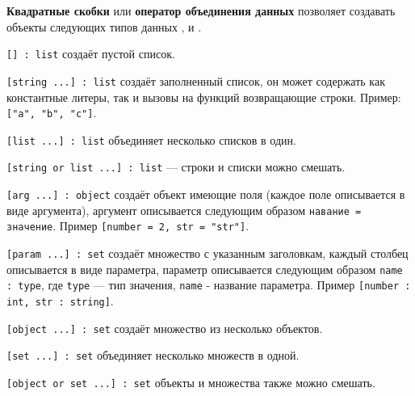 {\bf Квадратные скобки} или {\bf оператор объединения данных} позволяет создавать объекты следующих типов данных \listtype{}, \set{} и \object{}.

\texttt{[] : list} создаёт пустой список.

\texttt{[string ...] : list} создаёт заполненный список, он может содержать как константные литеры, так и вызовы на функций возвращающие строки. Пример: \texttt{["a", "b", "c"]}.

\texttt{[list ...] : list} объединяет несколько списков в один.

\texttt{[string or list ...] : list} — строки и списки можно смешать.

\texttt{[arg ...] : object} создаёт объект имеющие поля (каждое поле описывается в виде аргумента), аргумент описывается следующим образом \texttt{навание = значение}. Пример \texttt{[number = 2, str = "str"]}.

\texttt{[param ...] : set} создаёт множество с указанным заголовкам, каждый столбец описывается в виде параметра, параметр описывается следующим образом \texttt{name : type}, где \texttt{type} — тип значения, \texttt{name} - название параметра. Пример \texttt{[number : int, str : string]}.

\texttt{[object ...] : set} создаёт множество из несколько объектов.

\texttt{[set ...] : set} объединяет несколько множеств в одной.

\texttt{[object or set ...] : set} объекты и множества также можно смешать.

